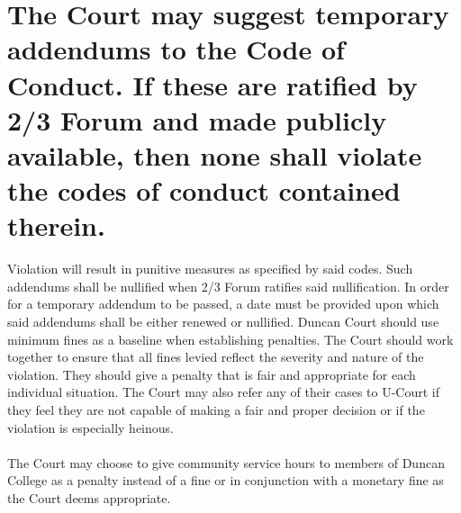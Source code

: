\documentclass[11pt]{article}
\begin{document}
\section{\textbf{The Court may suggest temporary addendums to the Code of Conduct. If these are ratified by 2/3 Forum and made publicly available, then none shall violate the codes of conduct contained therein.}}
Violation will result in punitive measures as specified by said codes. Such addendums shall be nullified when 2/3 Forum ratifies said nullification. In order for a temporary addendum to be passed, a date must be provided upon which said addendums shall be either renewed or nullified.
Duncan Court should use minimum fines as a baseline when establishing penalties. The Court should work together to ensure that all fines levied reflect the severity and nature of the violation. They should give a penalty that is fair and appropriate for each individual situation. The Court may also refer any of their cases to U-Court if they feel they are not capable of making a fair and proper decision or if the violation is especially heinous.\\ \\
The Court may choose to give community service hours to members of Duncan College as a penalty instead of a fine or in conjunction with a monetary fine as the Court deems appropriate.
\end{document}

